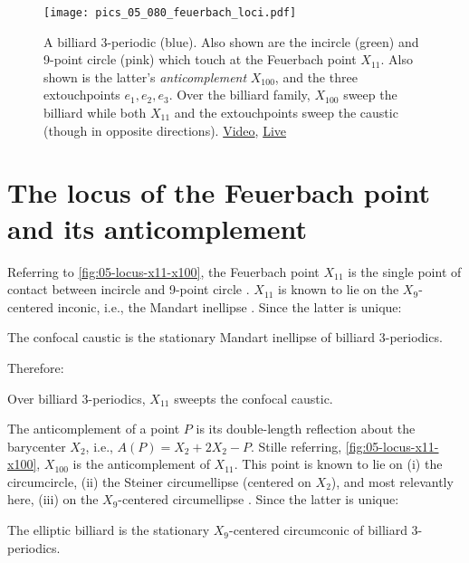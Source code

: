 \begin{figure}
    \centering
    \texttt{[image: pics\_05\_080\_feuerbach\_loci.pdf]}
    \caption{A billiard 3-periodic (blue). Also shown are the incircle (green) and 9-point circle (pink) which touch at the Feuerbach point $X_{11}$. Also shown is the latter's {\em anticomplement} $X_{100}$, and the three extouchpoints $e_1,e_2,e_3$. Over the billiard family, $X_{100}$ sweep the billiard while both $X_{11}$ and the extouchpoints sweep the caustic (though in opposite directions).
    \href{https://youtu.be/TXdg7tUl8lc}{Video},
    \label{fig:05-feuer-loci} \href{https://bit.ly/2S2LVqp}{Live}}
\end{figure}

\section{The locus of the Feuerbach point and its anticomplement}
\label{sec:05-x11-x100}

Referring to \cref{fig:05-locus-x11-x100}, the Feuerbach point $X_{11}$ is the single point of contact between incircle and 9-point circle \cite[X(11)]{mw}. $X_{11}$ is known to lie on the $X_{9}$-centered inconic, i.e., the  Mandart inellipse \cite[Mandart inellipse]{mw}. Since the latter is unique:

\begin{observation}
The confocal caustic is the stationary Mandart inellipse of billiard 3-periodics.
\end{observation}

Therefore:

\begin{proposition}
Over billiard 3-periodics, $X_{11}$ sweepts the confocal caustic.
\end{proposition}

The anticomplement of a point $P$ is its double-length reflection about the barycenter $X_2$, i.e., $A(P) = X_2+2 X_2-P$. Stille referring,  \cref{fig:05-locus-x11-x100}, $X_{100}$ is the anticomplement of $X_{11}$. This point is known to lie on (i) the circumcircle, (ii) the Steiner circumellipse (centered on $X_2$), and most relevantly here, (iii) on the $X_9$-centered circumellipse \cite[X(9)]{etc}. Since the latter is unique:

\begin{observation}
The elliptic billiard is the stationary $X_9$-centered circumconic of billiard 3-periodics.
\end{observation}

